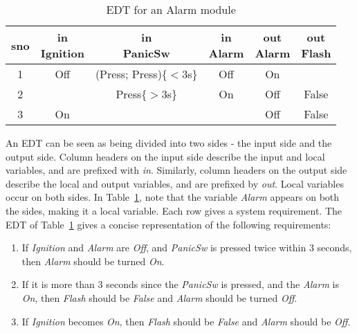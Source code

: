 \begin{table}[h!]
  \centering {}
  \caption{EDT for an Alarm module}
  \label{tab:edt-alarm}
  \begin{tabular}{|c|c|c|c||c|c|}
    \hline
    sno & \specialcell{in \\ Ignition} &
                                         \specialcell{in \\ PanicSw} &
                                                                       \specialcell{in 
    \\ Alarm} & \specialcell{out \\ Alarm} & 
                                             \specialcell{out \\ Flash} \\
    \hline 
    1 & Off & (Press; Press)\{$<3$s\} & Off & On &
    \\
    \hline
    2 & & Press\{$>3$s\} & On & Off & False \\
    \hline
    3 & On & & & Off & False \\
    \hline
  \end{tabular}
  
\end{table}
An EDT can be seen as being divided into two sides - the input side
and the output side. Column headers on the input side describe the
input and local variables, and are prefixed with \emph{in}. Similarly,
column headers on the output side describe the local and output
variables, and are prefixed by \emph{out}. Local variables occur on
both sides. In Table~\ref{tab:edt-alarm}, note that the variable
\emph{Alarm} appears on both the sides, making it a local
variable. Each row gives a system requirement. The EDT of
Table~\ref{tab:edt-alarm} gives a concise representation of the
following requirements:
\begin{enumerate}
\item If \emph{Ignition} and \emph{Alarm} are \emph{Off}, and
  \emph{PanicSw} is pressed twice within $3$ seconds, then
  \emph{Alarm} should be turned \emph{On}.

\item If it is more than $3$ seconds since the \emph{PanicSw} is
  pressed, and the \emph{Alarm} is \emph{On}, then \emph{Flash}
  should be \emph{False} and \emph{Alarm} should be turned \emph{Off}.

\item If \emph{Ignition} becomes \emph{On}, then \emph{Flash} should
  be \emph{False} and \emph{Alarm} should be \emph{Off}.
\end{enumerate}

